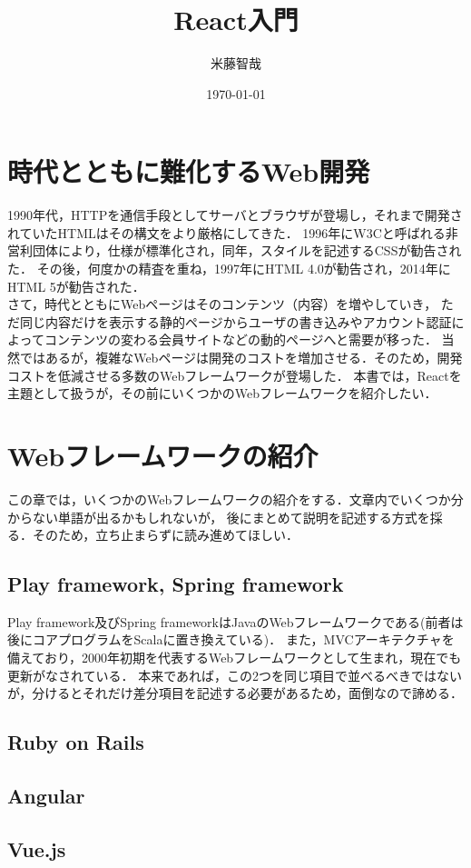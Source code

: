 \documentclass[11pt,a4paper]{jsarticle}
\title{React入門}
\author{米藤智哉}
\date{\today}
\begin{document}
\maketitle
%
%
\section{時代とともに難化するWeb開発}
1990年代，HTTPを通信手段としてサーバとブラウザが登場し，それまで開発されていたHTMLはその構文をより厳格にしてきた．
1996年にW3Cと呼ばれる非営利団体により，仕様が標準化され，同年，スタイルを記述するCSSが勧告された．
その後，何度かの精査を重ね，1997年にHTML 4.0が勧告され，2014年にHTML 5が勧告された．\\
さて，時代とともにWebページはそのコンテンツ（内容）を増やしていき，
ただ同じ内容だけを表示する静的ページからユーザの書き込みやアカウント認証によってコンテンツの変わる会員サイトなどの動的ページへと需要が移った．
当然ではあるが，複雑なWebページは開発のコストを増加させる．そのため，開発コストを低減させる多数のWebフレームワークが登場した．
本書では，Reactを主題として扱うが，その前にいくつかのWebフレームワークを紹介したい．

\section{Webフレームワークの紹介}
この章では，いくつかのWebフレームワークの紹介をする．文章内でいくつか分からない単語が出るかもしれないが，
後にまとめて説明を記述する方式を採る．そのため，立ち止まらずに読み進めてほしい．

\subsection{Play framework, Spring framework}
Play framework及びSpring frameworkはJavaのWebフレームワークである(前者は後にコアプログラムをScalaに置き換えている)．
また，MVCアーキテクチャを備えており，2000年初期を代表するWebフレームワークとして生まれ，現在でも更新がなされている．
本来であれば，この2つを同じ項目で並べるべきではないが，分けるとそれだけ差分項目を記述する必要があるため，面倒なので諦める．

\subsection{Ruby on Rails}
\subsection{Angular}
\subsection{Vue.js}
\end{document}
